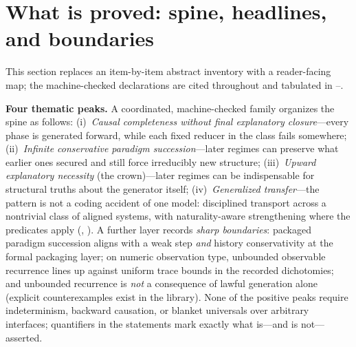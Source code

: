 \documentclass[11pt,a4paper]{article}
\theoremstyle{definition}
\begin{document}
\section{What is proved: spine, headlines, and boundaries}\label{sec:proved-overview}

\noindent
This section replaces an item-by-item abstract inventory with a reader-facing map; the machine-checked declarations are cited throughout and tabulated in --.

\medskip
\noindent
\textbf{Four thematic peaks.} A coordinated, machine-checked family organizes the spine as follows: (i)~\emph{Causal completeness without final explanatory closure}---every phase is generated forward, while each fixed reducer in the class fails somewhere; (ii)~\emph{Infinite conservative paradigm succession}---later regimes can preserve what earlier ones secured and still force irreducibly new structure; (iii)~\emph{Upward explanatory necessity} (the crown)---later regimes can be indispensable for structural truths about the generator itself; (iv)~\emph{Generalized transfer}---the pattern is not a coding accident of one model: disciplined transport across a nontrivial class of aligned systems, with naturality-aware strengthening where the predicates apply (, ). A further layer records \emph{sharp boundaries}: packaged paradigm succession aligns with a weak step \emph{and} history conservativity at the formal packaging layer; on numeric observation type, unbounded observable recurrence lines up against uniform trace bounds in the recorded dichotomies; and unbounded recurrence is \emph{not} a consequence of lawful generation alone (explicit counterexamples exist in the library). None of the positive peaks require indeterminism, backward causation, or blanket universals over arbitrary interfaces; quantifiers in the statements mark exactly what is---and is not---asserted.
\end{document}
